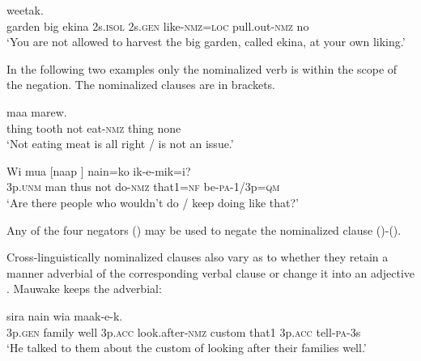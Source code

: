 \ea%
\label{ex:x1234}
\gll [\textstyleEmphasizedVernacularWords{Manin(a)} \textstyleEmphasizedVernacularWords{maneka}, \textstyleEmphasizedVernacularWords{ekina}, \textstyleEmphasizedVernacularWords{naisow} \textstyleEmphasizedVernacularWords{nena} \textstyleEmphasizedVernacularWords{kookal-owa}\textstyleEmphasizedVernacularWords{=pa} \textstyleEmphasizedVernacularWords{perek-owa}]  weetak. \\
     garden    big    ekina  2s.\textsc{isol}  2s.\textsc{gen} like-\textsc{nmz}=\textsc{loc}   pull.out-\textsc{nmz}  no \\
\glt `You are not allowed to harvest the big garden, called ekina, at your own liking.'
\z

In the following two examples only the nominalized verb is within the scope of the negation. The nominalized clauses are in brackets.

\ea%
\label{ex:x1235}
  maa  marew. \\
     thing  tooth  not  eat-\textsc{nmz}  thing  none \\
\glt `Not eating meat is all right / is not an issue.'
\z

\ea%
\label{ex:x1236}
\gll Wi  mua  [naap   ]  nain=ko  ik-e-mik=i? \\
     3p.\textsc{unm}  man  thus  not  do-\textsc{nmz}  that1=\textsc{nf}  be-\textsc{pa}-1/3p=\textsc{qm} \\
\glt `Are there people who wouldn't do / keep doing like that?'
\z

Any of the four negators () may be used to negate the nominalized clause ()-(). 

Cross-linguistically nominalized clauses also vary as to whether they retain a manner adverbial of the corresponding verbal clause or change it into an adjective \citep[374]{ComrieEtAl2007}%
. Mauwake keeps the adverbial: 

\ea%
\label{ex:x1237}
  sira  nain wia  maak-e-k. \\
     3p.\textsc{gen}  family  well  3p.\textsc{acc}  look.after-\textsc{nmz}  custom  that1 3p.\textsc{acc}  tell-\textsc{pa}-3s \\
\glt `He talked to them about the custom of looking after their families well.'
\z

